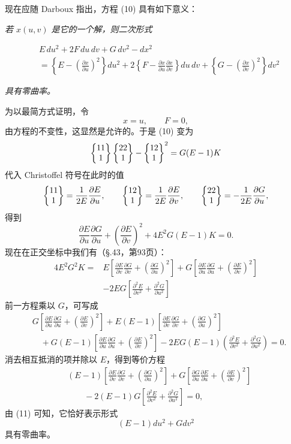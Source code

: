 现在应随 Darboux 指出，方程 (10) 具有如下意义：
\begin{center}
\emph{若 \(x(u,v)\) 是它的一个解，则二次形式}
\end{center}
\[
\begin{aligned}
&E\,du^2+2F\,du\,dv+G\,dv^2-dx^2 \\
&=\left\{E-\left(\frac{\partial x}{\partial u}\right)^2\right\}du^2
+2\left\{F-\frac{\partial x}{\partial u}\frac{\partial x}{\partial v}\right\}du\,dv
+\left\{G-\left(\frac{\partial x}{\partial v}\right)^2\right\}dv^2
\end{aligned}
\]
\begin{center}
\emph{具有零曲率。}\end{center}
为以最简方式证明，令
\[
 x=u,
 \qquad F=0,
\]
由方程的不变性，这显然是允许的。于是 (10) 变为
\[
 \left\{\begin{matrix}11\\1\end{matrix}\right\}\left\{\begin{matrix}22\\1\end{matrix}\right\}-\left\{\begin{matrix}12\\1\end{matrix}\right\}^2=G(E-1)K
\]
代入 Christoffel 符号在此时的值
\[
 \left\{\begin{matrix}11\\1\end{matrix}\right\}=\frac1{2E}\frac{\partial E}{\partial u},\qquad
 \left\{\begin{matrix}12\\1\end{matrix}\right\}=\frac1{2E}\frac{\partial E}{\partial v},\qquad
 \left\{\begin{matrix}22\\1\end{matrix}\right\}=-\frac1{2E}\frac{\partial G}{\partial u},
\]
得到
\[
 \frac{\partial E}{\partial u}\frac{\partial G}{\partial u}
 +\left(\frac{\partial E}{\partial v}\right)^2
 +4E^2G(E-1)K=0.
\]
现在在正交坐标中我们有（\S.43，第93页）：
\begin{equation}\tag{11}
\begin{aligned}
4E^2G^2K={}&E\left[\frac{\partial E}{\partial v}\frac{\partial G}{\partial v}+
\left(\frac{\partial G}{\partial u}\right)^2\right]
+G\left[\frac{\partial E}{\partial u}\frac{\partial G}{\partial u}+
\left(\frac{\partial E}{\partial v}\right)^2\right]\\
&-2EG\left[\frac{\partial^2E}{\partial v^2}+\frac{\partial^2G}{\partial u^2}\right]
\end{aligned}
\end{equation}
前一方程乘以 \(G\)，可写成
\[
\begin{aligned}
&G\left[\frac{\partial E}{\partial u}\frac{\partial G}{\partial u}+
\left(\frac{\partial E}{\partial v}\right)^2\right]
+E(E-1)\left[\frac{\partial E}{\partial v}\frac{\partial G}{\partial v}+
\left(\frac{\partial G}{\partial u}\right)^2\right] \\
&\quad+G(E-1)\left[\frac{\partial E}{\partial u}\frac{\partial G}{\partial u}+
\left(\frac{\partial E}{\partial v}\right)^2\right]
-2EG(E-1)\left(\frac{\partial^2E}{\partial v^2}+\frac{\partial^2G}{\partial u^2}\right)=0.
\end{aligned}
\]
消去相互抵消的项并除以 \(E\)，得到等价方程
\[
\begin{aligned}
&(E-1)\left[\frac{\partial E}{\partial v}\frac{\partial G}{\partial v}+
\left(\frac{\partial G}{\partial u}\right)^2\right]
+G\left[\frac{\partial G}{\partial u}\frac{\partial E}{\partial u}+
\left(\frac{\partial E}{\partial v}\right)^2\right]\\
&\qquad -2(E-1)G\left[\frac{\partial^2E}{\partial v^2}+\frac{\partial^2G}{\partial u^2}\right]=0,
\end{aligned}
\]
由 (11) 可知，它恰好表示形式
\[
 (E-1)du^2+Gdv^2
\]
具有零曲率。


